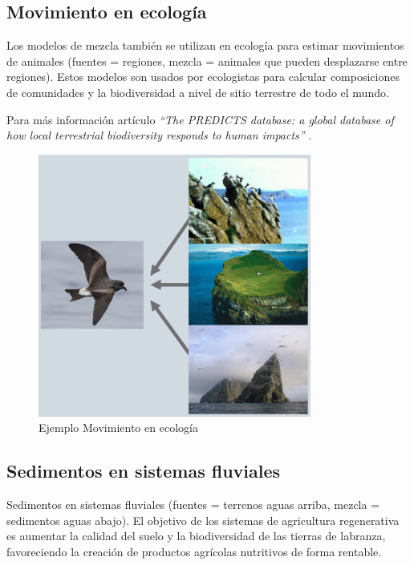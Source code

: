 \clearpage

\subsection{Movimiento en ecología}

Los modelos de mezcla también se utilizan en ecología para estimar movimientos de animales (fuentes = regiones, mezcla =  animales que pueden desplazarse entre regiones). Estos modelos son usados por ecologistas para calcular composiciones de comunidades y la biodiversidad a nivel de sitio terrestre de todo el mundo.

Para más información artículo \emph{``The PREDICTS database: a global database of how local terrestrial biodiversity responds to human impacts''} \cite{biodiversity:2014}.

\begin{figure}[h!] 
\centering
    \includegraphics[width=0.8\textwidth]{img/colonyBird.PNG}
\caption{Ejemplo Movimiento en ecología }
\label{fig:colonyBird}
\end{figure}

\clearpage

\subsection{Sedimentos en sistemas fluviales}

Sedimentos en sistemas fluviales (fuentes = terrenos aguas arriba, mezcla = sedimentos aguas abajo). El objetivo de los sistemas de agricultura regenerativa \cite{rodale:1983} es aumentar la calidad del suelo y la biodiversidad de las tierras de labranza, favoreciendo la creación de productos agrícolas nutritivos de forma rentable.

